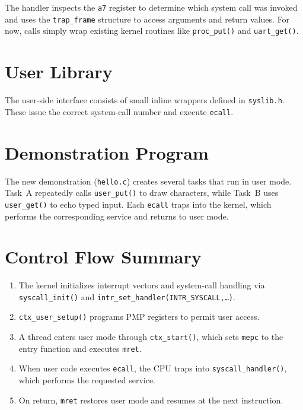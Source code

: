 The handler inspects the \texttt{a7} register to determine which system call was
invoked and uses the \texttt{trap\_frame} structure to access arguments and
return values.  
For now, calls simply wrap existing kernel routines like \texttt{proc\_put()} and
\texttt{uart\_get()}.

\section{User Library}

The user-side interface consists of small inline wrappers defined in
\texttt{syslib.h}.  
These issue the correct system-call number and execute \texttt{ecall}.



\section{Demonstration Program}

The new demonstration (\texttt{hello.c}) creates several tasks that run in user
mode.  
Task~A repeatedly calls \texttt{user\_put()} to draw characters, while
Task~B uses \texttt{user\_get()} to echo typed input.
Each \texttt{ecall} traps into the kernel, which performs the corresponding
service and returns to user mode.



\section{Control Flow Summary}

\begin{enumerate}
  \item The kernel initializes interrupt vectors and system-call handling via
        \texttt{syscall\_init()} and \texttt{intr\_set\_handler(INTR\_SYSCALL,\dots)}.
  \item \texttt{ctx\_user\_setup()} programs PMP registers to permit user access.
  \item A thread enters user mode through \texttt{ctx\_start()}, which sets
        \texttt{mepc} to the entry function and executes \texttt{mret}.
  \item When user code executes \texttt{ecall}, the CPU traps into
        \texttt{syscall\_handler()}, which performs the requested service.
  \item On return, \texttt{mret} restores user mode and resumes at the next
        instruction.
\end{enumerate}

